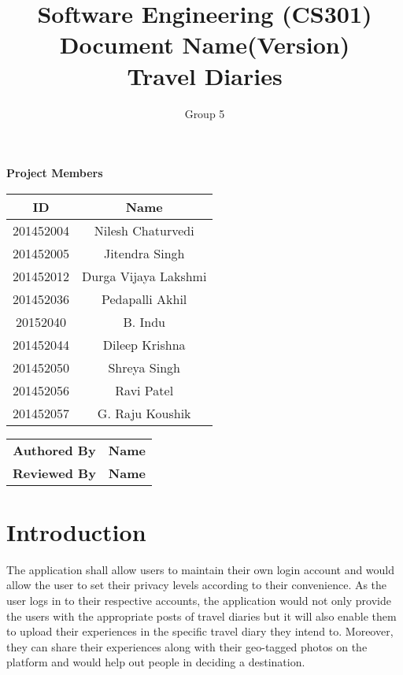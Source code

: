 \documentclass[]{article}
\title{Software Engineering (CS301)\\ Document Name(Version)\\Travel Diaries}
\author{Group 5}
\begin{document}
\maketitle


\begin{center}
\textbf{Project Members}\\
\vspace*{.6cm}
\begin{tabular}{|c|c|}
\hline
\textbf{ID} & \textbf{Name}\\
\hline
\hline
201452004 & Nilesh Chaturvedi\\
\hline
201452005 & Jitendra Singh\\
\hline
201452012 & Durga Vijaya Lakshmi\\
\hline
201452036 & Pedapalli Akhil\\
\hline
20152040 & B. Indu\\
\hline
201452044 & Dileep Krishna\\
\hline
201452050 & Shreya Singh\\
\hline
201452056 & Ravi Patel\\
\hline
201452057 & G. Raju Koushik\\
\hline
\end{tabular}

\vspace*{1cm}

\begin{tabular}{|c|c|}
\hline
\textbf{Authored By} & \textbf{Name}\\
\textbf{Reviewed By} & \textbf{Name}\\
\hline
\end{tabular}
\end{center}

\newpage
\tableofcontents
\newpage


\section{Introduction}
The application shall allow users to maintain their own login account and would allow the user to set
their privacy levels according to their convenience. As the user logs in to their respective accounts, the
application would not only provide the users with the appropriate posts of travel diaries but it will also
enable them to upload their experiences in the specific travel diary they intend to. Moreover, they can
share their experiences along with their geo-tagged photos on the platform and would help out people
in deciding a destination.
\end{document}
